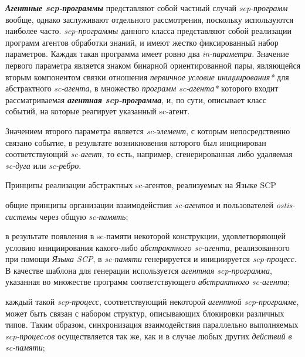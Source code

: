 \textbf{\textit{Агентные scp-программы}} представляют собой частный случай \textit{scp-программ} вообще, однако заслуживают отдельного рассмотрения, поскольку используются наиболее часто. \textit{scp-программы} данного класса представляют собой реализации программ агентов обработки знаний, и имеют жестко фиксированный набор параметров. Каждая такая программа имеет ровно два \textit{in-параметра\scnrolesign}. Значение первого параметра является знаком бинарной ориентированной пары, являющейся вторым компонентом связки отношения \textit{первичное условие инициирования*} для абстрактного \textit{sc-агента}, в множество \textit{программ sc-агента*} которого входит рассматриваемая \textbf{\textit{агентная scp-программа}}, и, по сути, описывает класс событий, на которые реагирует указанный sc-агент.
	
Значением второго параметра является \textit{sc-элемент}, с которым непосредственно связано событие, в результате возникновения которого был инициирован соответствующий \textit{sc-агент}, то есть, например, сгенерированная либо удаляемая \textit{sc-дуга} или \textit{sc-ребро}.

\begin{frame}{\large Принципы реализации абстрактных sc-агентов, реализуемых на Языке SCP}
\vspace{15}
    \begin{textitemize}
    \item общие принципы организации взаимодействия \textit{sc-агентов} и пользователей \textit{ostis-системы} через общую \textit{sc-память};
\item в результате появления в sc-памяти некоторой конструкции, удовлетворяющей условию инициирования какого-либо \textit{абстрактного sc-агента}, реализованного при помощи \textit{Языка SCP}, в \textit{sc-памяти} генерируется и инициируется \textit{scp-процесс}. В качестве шаблона для генерации используется \textit{агентная scp-программа}, указанная во множестве программ соответствующего \textit{абстрактного sc-агента};
\item каждый такой \textit{scp-процесс}, соответствующий некоторой \textit{агентной scp-программе}, может быть связан с набором структур, описывающих блокировки различных типов. Таким образом, синхронизация взаимодействия параллельно выполняемых \textit{scp-процесcов} осуществляется так же, как и в случае любых других \textit{действий в sc-памяти};
\end{textitemize}
\end{frame}

